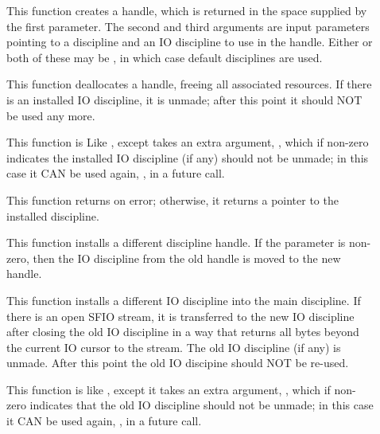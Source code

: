 \begin{description}
\item[\small{}]
This function creates a \pads{} handle, which is returned in the space
supplied by the first parameter.  The second and third arguments are
input parameters pointing to a \pads{} discipline and an IO discipline
to use in the handle.  Either or both of these may be , in
which case default disciplines are used.

\item[\small{}]
This function deallocates a \pads{} handle, freeing all associated resources.
If there is an installed IO discipline,
it is unmade; after this point it should NOT be used any more.

\item[\small{}]
This function is Like , except takes an extra argument, , which
if non-zero indicates the installed IO discipline (if any) should not be unmade;
in this case it CAN be used again, \cd{}, in a future 
      call.

\item[\small{}]
This function returns  on error; otherwise, it returns a
pointer to the installed discipline.

\item[\small{}]
This function installs a different discipline handle.  If the
parameter  is non-zero, then the IO discipline from the 
old handle is moved to the new handle.

\item[\small{}]
This function installs a different IO discipline into the
main discipline.  If there is an open SFIO stream,
it is transferred to the new IO discipline after closing the old IO
discipline in a way that returns all bytes beyond the current IO cursor to 
the stream.  The old IO discipline (if any) is unmade.   After this
point the old IO discipine should NOT be re-used.  

\item[\small{}]
This function is like , except it takes an extra argument, ,
which if non-zero indicates that the old IO discipline
should not be unmade; in this case it CAN be used again, \eg{}, in a future
 call. 


\end{description}

